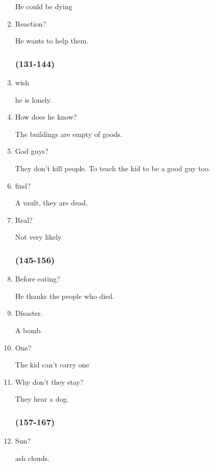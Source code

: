 \begin{multicols}{3}
\begin{enumerate}
    He could be dying

    \item Reaction?

    He wants to help them.

    \subsubsection{(131-144)}

    \item wish

    he is lonely.

    \item How does he know?

    The buildings are empty of goods.

    \item God guys?

    They don’t kill people. To teach the kid to be a good guy too.

    \item find?

    A vault, they are dead.

    \item Real?

    Not very likely

    \subsubsection{(145-156)}

    \item Before eating?

    He thanks the people who died.

    \item Disaster.

    A bomb.

    \item One?

    The kid can’t carry one

    \item Why don’t they stay?

    They hear a dog.

    \subsubsection{(157-167)}

    \item Sun?

    ash clouds.


\end{enumerate}
\end{multicols}
